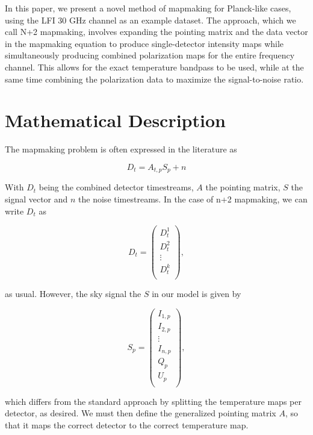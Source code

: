 \documentclass{aa}
\begin{document}
In this paper, we present a novel method of mapmaking for Planck-like cases, using the LFI 30 GHz channel as an example dataset. The approach, which we call N+2 mapmaking, involves expanding the pointing matrix and the data vector in the mapmaking equation to produce single-detector intensity maps while simultaneously producing combined polarization maps for the entire frequency channel. This allows for the exact temperature bandpass to be used, while at the same time combining the polarization data to maximize the signal-to-noise ratio.

\section{Mathematical Description}

The mapmaking problem is often expressed in the literature as \citep{de_Gasperis_2005}

\begin{equation}
D_t = A_{t,p}S_p + n
\end{equation}

With $D_t$ being the combined detector timestreams, $A$ the pointing matrix, $S$ the signal vector and $n$ the noise timestreams. In the case of n+2 mapmaking, we can write $D_t$ as 

\begin{equation}
D_t = \begin{pmatrix}
D_t^1\\ D_t^2\\ \vdots \\ D_t^k\\
\end{pmatrix},
\end{equation}

as usual. However, the sky signal the $S$ in our model is given by 

\begin{equation}
S_p = \begin{pmatrix}
I_{1,p}\\
I_{2,p}\\
\vdots\\
I_{n,p}\\
Q_p\\
U_p\\
\end{pmatrix},
\end{equation}

which differs from the standard approach by splitting the temperature maps per detector, as desired. We must then define the generalized pointing matrix $A$, so that it maps the correct detector to the correct temperature map.
\end{document}
